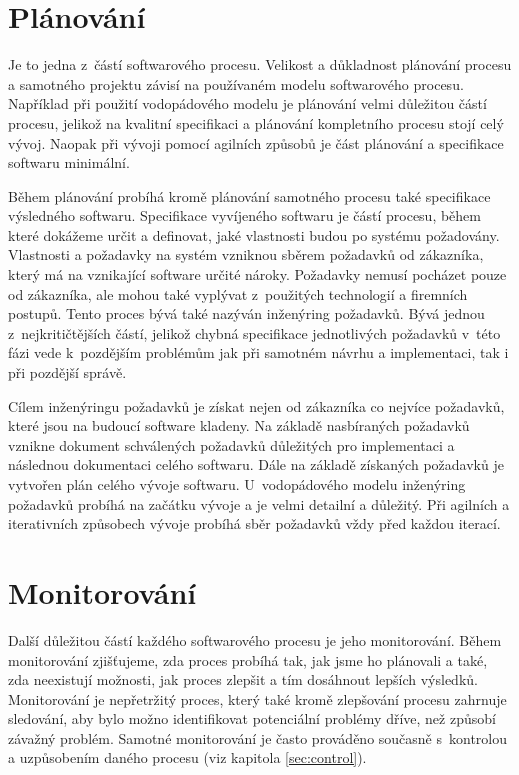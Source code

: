 \documentclass[czech,master]{diploma}
\begin{document}
\section{Plánování}
Je to jedna z~částí softwarového procesu. Velikost a důkladnost plánování procesu a samotného projektu závisí na používaném modelu softwarového procesu. Například při použití vodopádového modelu je plánování velmi důležitou částí procesu, jelikož na kvalitní specifikaci a plánování kompletního procesu stojí celý vývoj. Naopak při vývoji pomocí agilních způsobů je část plánování a specifikace softwaru minimální.

Během plánování probíhá kromě plánování samotného procesu také specifikace výsledného softwaru. Specifikace vyvíjeného softwaru je částí procesu, během které dokážeme určit a definovat, jaké vlastnosti budou po systému požadovány. Vlastnosti a požadavky na systém vzniknou sběrem požadavků od zákazníka, který má na vznikající software určité nároky. Požadavky nemusí pocházet pouze od zákazníka, ale mohou také vyplývat z~použitých technologií a firemních postupů. Tento proces bývá také nazýván inženýring požadavků. Bývá jednou z~nejkritičtějších částí, jelikož chybná specifikace jednotlivých požadavků v~této fázi vede k~pozdějším problémům jak při samotném návrhu a implementaci, tak i při pozdější správě.

Cílem inženýringu požadavků je získat nejen od zákazníka co nejvíce požadavků, které jsou na budoucí software kladeny. Na základě nasbíraných požadavků vznikne dokument schválených požadavků důležitých pro implementaci a následnou dokumentaci celého softwaru. Dále na základě získaných požadavků je vytvořen plán celého vývoje softwaru. U~vodopádového modelu inženýring požadavků probíhá na začátku vývoje a je velmi detailní a důležitý. Při agilních a iterativních způsobech vývoje probíhá sběr požadavků vždy před každou iterací.

\section{Monitorování}
Další důležitou částí každého softwarového procesu je jeho monitorování. Během monitorování zjišťujeme, zda proces probíhá tak, jak jsme ho plánovali a také, zda neexistují možnosti, jak proces zlepšit a tím dosáhnout lepších výsledků. Monitorování je nepřetržitý proces, který také kromě zlepšování procesu zahrnuje sledování, aby bylo možno identifikovat potenciální problémy dříve, než způsobí závažný problém. Samotné monitorování je často prováděno současně s~kontrolou a uzpůsobením daného procesu (viz kapitola \ref{sec:control}).
\end{document}

